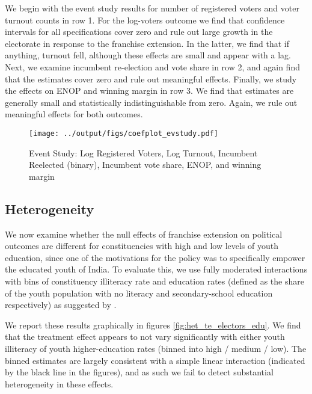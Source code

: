 We begin with the event study results for number of registered voters
and voter turnout counts in row 1. For the log-voters outcome we find
that confidence intervals for all specifications cover zero and rule
out large growth in the electorate in response to the franchise
extension. In the latter, we find that if anything, turnout fell,
although these effects are small and appear with a lag. Next, we
examine incumbent re-election and vote share in row 2, and again find
that the estimates cover zero and rule out meaningful effects.
Finally, we study the effects on ENOP and winning margin in row 3. We
find that estimates are generally small and statistically
indistinguishable from zero. Again, we rule out meaningful effects for
both outcomes.

\begin{figure}[tb]
  \centering
  \texttt{[image: ../output/figs/coefplot\_evstudy.pdf]}
\caption{Event Study: Log Registered Voters, Log Turnout, Incumbent
  Reelected (binary), Incumbent vote share, ENOP, and winning margin}
\label{fig:evstudy_main}
\end{figure}
\newpage

\subsection{Heterogeneity} %
\label{ssub:mechanisms}

We now examine whether the null effects of franchise extension on
political outcomes are different for constituencies with high and low
levels of youth education, since one of the motivations for the policy
was to specifically empower the educated youth of India. To evaluate
this, we use fully moderated interactions with bins of constituency
illiteracy rate and education rates (defined as the share of the youth
population with no literacy and secondary-school education
respectively) as suggested by \textcite{hainmueller2019much}.

We report these results graphically in figures
\ref{fig:het_te_electors_edu}. We find that the treatment effect
appears to not vary significantly with either youth illiteracy of
youth higher-education rates (binned into high / medium / low). The
binned estimates are largely consistent with a simple linear
interaction (indicated by the black line in the figures), and as such
we fail to detect substantial heterogeneity in these effects.


